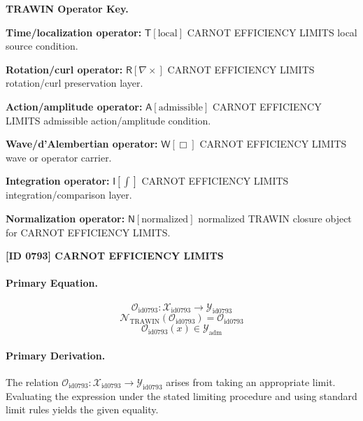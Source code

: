 \par\vspace{0.45\baselineskip}
\noindent\begin{minipage}[t]{\linewidth}
\begingroup
\small
\raggedright
\textbf{TRAWIN Operator Key.}\par
\noindent\textbf{Time/localization operator:} $\mathsf{T}\!\left[\mathrm{local}\right]$ CARNOT EFFICIENCY LIMITS local source condition.\par
\noindent\textbf{Rotation/curl operator:} $\mathsf{R}\!\left[\nabla\times\right]$ CARNOT EFFICIENCY LIMITS rotation/curl preservation layer.\par
\noindent\textbf{Action/amplitude operator:} $\mathsf{A}\!\left[\mathrm{admissible}\right]$ CARNOT EFFICIENCY LIMITS admissible action/amplitude condition.\par
\noindent\textbf{Wave/d'Alembertian operator:} $\mathsf{W}\!\left[\Box\right]$ CARNOT EFFICIENCY LIMITS wave or operator carrier.\par
\noindent\textbf{Integration operator:} $\mathsf{I}\!\left[\int\right]$ CARNOT EFFICIENCY LIMITS integration/comparison layer.\par
\noindent\textbf{Normalization operator:} $\mathsf{N}\!\left[\mathrm{normalized}\right]$ normalized TRAWIN closure object for CARNOT EFFICIENCY LIMITS.\par
\endgroup
\end{minipage}

\clearpage
\noindent\textbf{[ID 0793] CARNOT EFFICIENCY LIMITS}\par
\vspace{0.35em}
\paragraph{Primary Equation.}
\[
\mathcal{O}_{\mathrm{id0793}}:\mathcal{X}_{\mathrm{id0793}}\longrightarrow\mathcal{Y}_{\mathrm{id0793}}
\]
\[
\mathcal{N}_{\mathrm{TRAWIN}}(\mathcal{O}_{\mathrm{id0793}})=\mathcal{O}_{\mathrm{id0793}}
\]
\[
\mathcal{O}_{\mathrm{id0793}}(x)\in\mathcal{Y}_{\mathrm{adm}}
\]

\paragraph{Primary Derivation.}
The relation \( \mathcal{O}_{\mathrm{id0793}}:\mathcal{X}_{\mathrm{id0793}}\longrightarrow\mathcal{Y}_{\mathrm{id0793}} \) arises from taking an appropriate limit. Evaluating the expression under the stated limiting procedure and using standard limit rules yields the given equality.
